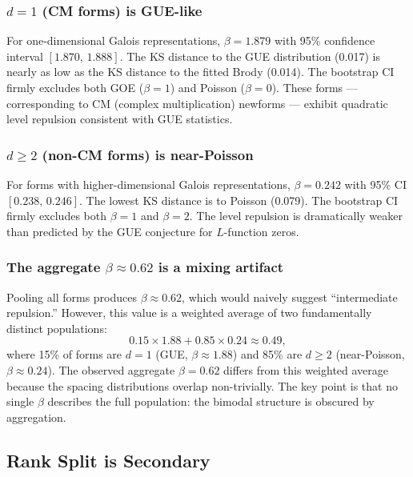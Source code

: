 \documentclass[11pt]{article}
\begin{document}
\subsubsection{$d=1$ (CM forms) is GUE-like}

For one-dimensional Galois representations, $\beta=1.879$ with 95\%
confidence interval $[1.870,\,1.888]$.  The KS distance to the GUE
distribution (0.017) is nearly as low as the KS distance to the fitted
Brody (0.014).  The bootstrap CI firmly excludes both GOE ($\beta=1$)
and Poisson ($\beta=0$).  These forms --- corresponding to CM
(complex multiplication) newforms --- exhibit quadratic level repulsion
consistent with GUE statistics.

\subsubsection{$d\ge2$ (non-CM forms) is near-Poisson}

For forms with higher-dimensional Galois representations, $\beta=0.242$
with 95\% CI $[0.238,\,0.246]$.  The lowest KS distance is to Poisson
(0.079).  The bootstrap CI firmly excludes both $\beta=1$ and $\beta=2$.
The level repulsion is dramatically weaker than predicted by the GUE
conjecture for $L$-function zeros.

\subsubsection{The aggregate $\beta\approx0.62$ is a mixing artifact}

Pooling all forms produces $\beta\approx0.62$, which would naively
suggest ``intermediate repulsion.''  However, this value is a weighted
average of two fundamentally distinct populations:
\begin{equation}
0.15 \times 1.88 + 0.85 \times 0.24 \approx 0.49,
\end{equation}
where 15\% of forms are $d=1$ (GUE, $\beta\approx1.88$) and 85\% are
$d\ge2$ (near-Poisson, $\beta\approx0.24$).  The observed aggregate
$\beta=0.62$ differs from this weighted average because the spacing
distributions overlap non-trivially.  The key point is that no single
$\beta$ describes the full population: the bimodal structure is
obscured by aggregation.

\subsection{Rank Split is Secondary}
\end{document}

